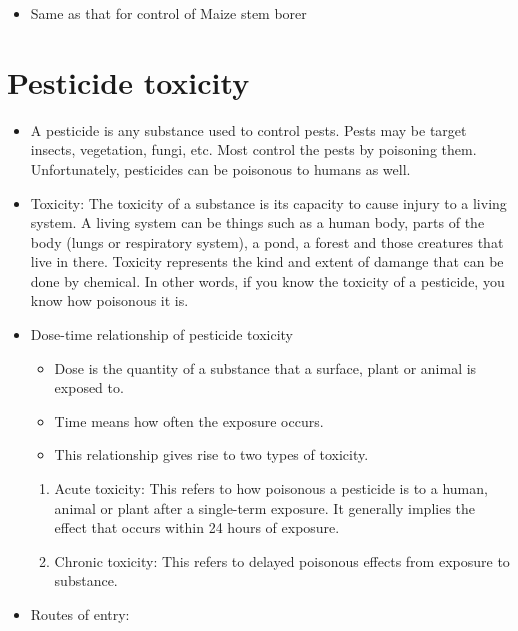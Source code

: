 \documentclass[]{book}
\providecommand{\tightlist}{%
  \setlength{\itemsep}{0pt}\setlength{\parskip}{0pt}}
\begin{document}
\begin{itemize}
\tightlist
\item
  Same as that for control of Maize stem borer
\end{itemize}

\hypertarget{pesticide-toxicity}{%
\section{Pesticide toxicity}\label{pesticide-toxicity}}

\begin{itemize}
\item
  A pesticide is any substance used to control pests. Pests may be target insects, vegetation, fungi, etc. Most control the pests by poisoning them. Unfortunately, pesticides can be poisonous to humans as well.
\item
  Toxicity: The toxicity of a substance is its capacity to cause injury to a living system. A living system can be things such as a human body, parts of the body (lungs or respiratory system), a pond, a forest and those creatures that live in there. Toxicity represents the kind and extent of damange that can be done by chemical. In other words, if you know the toxicity of a pesticide, you know how poisonous it is.
\item
  Dose-time relationship of pesticide toxicity

  \begin{itemize}
  \tightlist
  \item
    Dose is the quantity of a substance that a surface, plant or animal is exposed to.
  \item
    Time means how often the exposure occurs.
  \item
    This relationship gives rise to two types of toxicity.
  \end{itemize}

  \begin{enumerate}
  \def\labelenumi{\arabic{enumi}.}
  \tightlist
  \item
    Acute toxicity: This refers to how poisonous a pesticide is to a human, animal or plant after a single-term exposure. It generally implies the effect that occurs within 24 hours of exposure.
  \item
    Chronic toxicity: This refers to delayed poisonous effects from exposure to substance.
  \end{enumerate}
\item
  Routes of entry:


\end{itemize}
\end{document}
